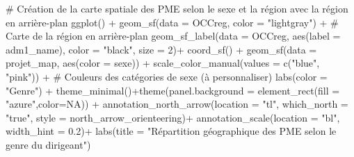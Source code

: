 \documentclass[
  letterpaper,
  DIV=11,
  numbers=noendperiod]{scrartcl}
\newenvironment{Shaded}{\begin{snugshade}}{\end{snugshade}}
\newcommand{\AttributeTok}[1]{\textcolor[rgb]{0.40,0.45,0.13}{#1}}
\newcommand{\CommentTok}[1]{\textcolor[rgb]{0.37,0.37,0.37}{#1}}
\newcommand{\ConstantTok}[1]{\textcolor[rgb]{0.56,0.35,0.01}{#1}}
\newcommand{\DecValTok}[1]{\textcolor[rgb]{0.68,0.00,0.00}{#1}}
\newcommand{\FloatTok}[1]{\textcolor[rgb]{0.68,0.00,0.00}{#1}}
\newcommand{\FunctionTok}[1]{\textcolor[rgb]{0.28,0.35,0.67}{#1}}
\newcommand{\NormalTok}[1]{\textcolor[rgb]{0.00,0.23,0.31}{#1}}
\newcommand{\SpecialCharTok}[1]{\textcolor[rgb]{0.37,0.37,0.37}{#1}}
\newcommand{\StringTok}[1]{\textcolor[rgb]{0.13,0.47,0.30}{#1}}
\begin{document}
\begin{Shaded}
\begin{Highlighting}[]
\CommentTok{\# Création de la carte spatiale des PME selon le sexe et la région avec la région en arrière{-}plan}
\FunctionTok{ggplot}\NormalTok{() }\SpecialCharTok{+}
  \FunctionTok{geom\_sf}\NormalTok{(}\AttributeTok{data =}\NormalTok{ OCCreg, }\AttributeTok{color =} \StringTok{"lightgray"}\NormalTok{) }\SpecialCharTok{+}  \CommentTok{\# Carte de la région en arrière{-}plan}
  \FunctionTok{geom\_sf\_label}\NormalTok{(}\AttributeTok{data =}\NormalTok{ OCCreg, }\FunctionTok{aes}\NormalTok{(}\AttributeTok{label =}\NormalTok{ adm1\_name), }\AttributeTok{color =} \StringTok{"black"}\NormalTok{, }\AttributeTok{size =} \DecValTok{2}\NormalTok{)}\SpecialCharTok{+}
  \FunctionTok{coord\_sf}\NormalTok{() }\SpecialCharTok{+}
  \FunctionTok{geom\_sf}\NormalTok{(}\AttributeTok{data =}\NormalTok{ projet\_map, }\FunctionTok{aes}\NormalTok{(}\AttributeTok{color =}\NormalTok{ sexe)) }\SpecialCharTok{+}
  \FunctionTok{scale\_color\_manual}\NormalTok{(}\AttributeTok{values =} \FunctionTok{c}\NormalTok{(}\StringTok{"blue"}\NormalTok{, }\StringTok{"pink"}\NormalTok{)) }\SpecialCharTok{+}  \CommentTok{\# Couleurs des catégories de sexe (à personnaliser)}
  \FunctionTok{labs}\NormalTok{(}\AttributeTok{color =} \StringTok{"Genre"}\NormalTok{) }\SpecialCharTok{+}
  \FunctionTok{theme\_minimal}\NormalTok{()}\SpecialCharTok{+}\FunctionTok{theme}\NormalTok{(}\AttributeTok{panel.background =} \FunctionTok{element\_rect}\NormalTok{(}\AttributeTok{fill =} \StringTok{"azure"}\NormalTok{,}\AttributeTok{color=}\ConstantTok{NA}\NormalTok{)) }\SpecialCharTok{+}
  \FunctionTok{annotation\_north\_arrow}\NormalTok{(}\AttributeTok{location =} \StringTok{"tl"}\NormalTok{, }\AttributeTok{which\_north =} \StringTok{"true"}\NormalTok{, }\AttributeTok{style =}\NormalTok{ north\_arrow\_orienteering)}\SpecialCharTok{+}
  \FunctionTok{annotation\_scale}\NormalTok{(}\AttributeTok{location =} \StringTok{"bl"}\NormalTok{, }\AttributeTok{width\_hint =} \FloatTok{0.2}\NormalTok{)}\SpecialCharTok{+}
  \FunctionTok{labs}\NormalTok{(}\AttributeTok{title =} \StringTok{"Répartition géographique des PME selon le genre du dirigeant"}\NormalTok{)}
\end{Highlighting}
\end{Shaded}
\end{document}
